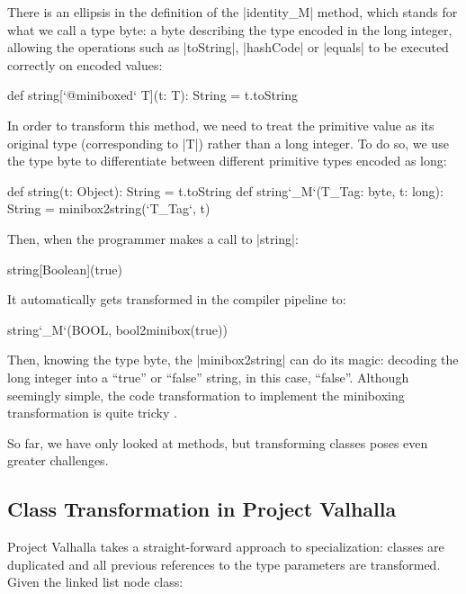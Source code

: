 There is an ellipsis in the definition of the |identity_M| method, which stands for what we call a type byte: a byte describing the type encoded in the long integer, allowing the operations such as |toString|, |hashCode| or |equals| to be executed correctly on encoded values:

\begin{lstlisting-nobreak}
 def string[`@miniboxed` T](t: T): String = t.toString
\end{lstlisting-nobreak}

In order to transform this method, we need to treat the primitive value as its original type (corresponding to |T|) rather than a long integer. To do so, we use the type byte to differentiate between different primitive types encoded as long:

\begin{lstlisting-nobreak}
 def string(t: Object): String = t.toString
 def string`_M`(T_Tag: byte, t: long): String =
                                        minibox2string(`T_Tag`, t)
\end{lstlisting-nobreak}

Then, when the programmer makes a call to |string|:

\begin{lstlisting-nobreak}
 string[Boolean](true)
\end{lstlisting-nobreak}

It automatically gets transformed in the compiler pipeline to:

\begin{lstlisting-nobreak}
 string`_M`(BOOL, bool2minibox(true))
\end{lstlisting-nobreak}

Then, knowing the type byte, the |minibox2string| can do its magic: decoding the long integer into a ``true'' or ``false'' string, in this case, ``false''. Although seemingly simple, the code transformation to implement the miniboxing transformation is quite tricky \cite{miniboxing-linkedlist, ldl, ildl-tech}.

So far, we have only looked at methods, but transforming classes poses even greater challenges.

\subsection{Class Transformation in Project Valhalla}

Project Valhalla takes a straight-forward approach to specialization: classes are duplicated and all previous references to the type parameters are transformed. Given the linked list node class:

